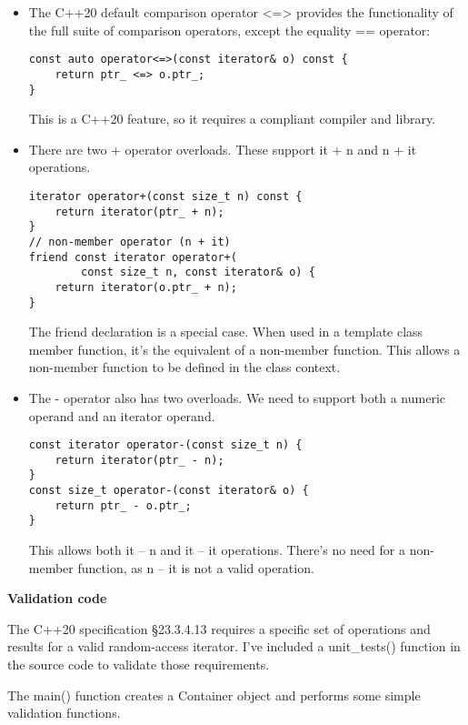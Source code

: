 \begin{itemize}
\item 
The C++20 default comparison operator <=> provides the functionality of the full suite of comparison operators, except the equality == operator:

\begin{lstlisting}[style=styleCXX]
const auto operator<=>(const iterator& o) const {
	return ptr_ <=> o.ptr_;
}
\end{lstlisting}

This is a C++20 feature, so it requires a compliant compiler and library.

\item 
There are two + operator overloads. These support it + n and n + it operations.

\begin{lstlisting}[style=styleCXX]
iterator operator+(const size_t n) const {
	return iterator(ptr_ + n);
}
// non-member operator (n + it)
friend const iterator operator+(
		const size_t n, const iterator& o) {
	return iterator(o.ptr_ + n);
}
\end{lstlisting}

The friend declaration is a special case. When used in a template class member function, it's the equivalent of a non-member function. This allows a non-member function to be defined in the class context.

\item 
The - operator also has two overloads. We need to support both a numeric operand and an iterator operand.

\begin{lstlisting}[style=styleCXX]
const iterator operator-(const size_t n) {
	return iterator(ptr_ - n);
}
const size_t operator-(const iterator& o) {
	return ptr_ - o.ptr_;
}
\end{lstlisting}

This allows both it – n and it – it operations. There's no need for a non-member function, as n – it is not a valid operation.

\end{itemize}


\noindent
\textbf{Validation code}

The C++20 specification §23.3.4.13 requires a specific set of operations and results for a valid random-access iterator. I've included a unit\_tests() function in the source code to validate those requirements.

The main() function creates a Container object and performs some simple validation functions.

